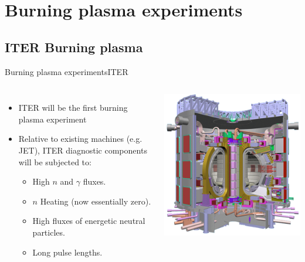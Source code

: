 \documentclass{beamer}
\begin{document}
\section{Burning plasma experiments}
\subsection{ITER Burning plasma}

\begin{frame}{Burning plasma experiments}{ITER}
	\begin{columns}
  		\begin{itemize}
			\item ITER will be the first burning plasma experiment
			\item Relative to existing machines (e.g. JET), ITER diagnostic components will be subjected to:
			\begin{itemize}
				\item High $n$ and $\gamma$ fluxes.
				\item $n$ Heating (now essentially zero).
				\item High fluxes of energetic neutral particles.
				\item Long pulse lengths.
			\end{itemize}
		\end{itemize}
			\begin{center}
				\includegraphics[width=0.8  \columnwidth]{ITER.png}
			\end{center}
 	 \end{columns}
\end{frame}
\end{document}
